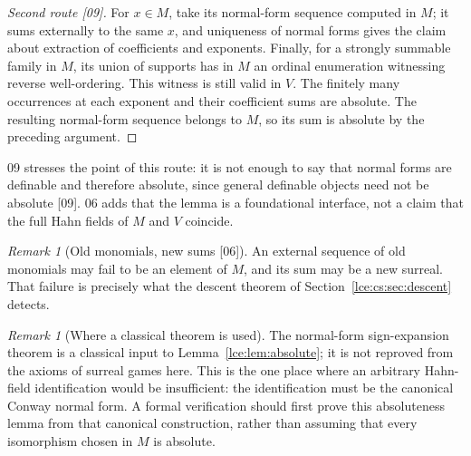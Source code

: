 \documentclass[11pt,letterpaper]{article}
\numberwithin{equation}{section}
\theoremstyle{definition}
\theoremstyle{remark}
\newtheorem{remark}[theorem]{Remark}
\newcommand{\leref}[1]{Lemma~\ref{#1}}
\newcommand{\src}[1]{\textup{\textsf{\small[#1]}}}%
\begin{document}
\begin{proof}[Second route \src{09}]
For $x\in M$, take its normal-form sequence computed in $M$; it sums
externally to the same $x$, and uniqueness of normal forms gives the claim
about extraction of coefficients and exponents. Finally, for a strongly
summable family in $M$, its union of supports has in $M$ an ordinal
enumeration witnessing reverse well-ordering. This witness is still valid in
$V$. The finitely many occurrences at each exponent and their coefficient
sums are absolute. The resulting normal-form sequence belongs to $M$, so its
sum is absolute by the preceding argument.
\end{proof}
09 stresses the point of this route: it is not enough to say that normal
forms are definable and therefore absolute, since general definable objects
need not be absolute \src{09}. 06 adds that the lemma is a foundational
interface, not a claim that the full Hahn fields of $M$ and $V$ coincide.

\begin{remark}[Old monomials, new sums \src{06}]\label{lce:cs:rem:interface}
An external sequence of old monomials may fail to be an element of $M$,
and its sum may be a new surreal. That failure is precisely what the
descent theorem of Section~\ref{lce:cs:sec:descent} detects.
\end{remark}

\begin{remark}[Where a classical theorem is used]\label{lce:rem:classicalinput}
The normal-form sign-expansion theorem is a classical input to
\leref{lce:lem:absolute}; it is not reproved from the axioms of surreal games
here. This is the one place where an arbitrary Hahn-field identification
would be insufficient: the identification must be the canonical Conway
normal form. A formal verification should first prove this absoluteness
lemma from that canonical construction, rather than assuming that every
isomorphism chosen in $M$ is absolute.
\end{remark}
\end{document}
